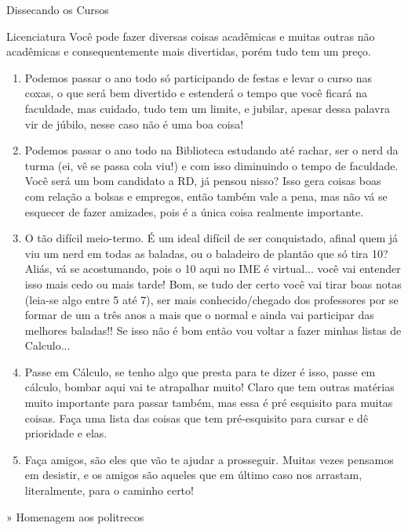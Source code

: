 \begin{secao}{Dissecando os Cursos}
\begin{subsecao}{Licenciatura}
Você pode fazer diversas coisas acadêmicas e muitas outras não acadêmicas e consequentemente mais divertidas, porém tudo tem um preço. 
\begin{enumerate}
\item	Podemos passar o ano todo só participando de festas e levar o curso nas coxas, o que será bem divertido e estenderá o tempo que você ficará na faculdade, mas cuidado, tudo tem um limite, e jubilar, apesar dessa palavra vir de júbilo, nesse caso não é uma boa coisa! 
\item	Podemos passar o ano todo na Biblioteca estudando até rachar, ser o nerd da turma (ei, vê se passa cola viu!) e com isso diminuindo o tempo de faculdade. Você será um bom candidato a RD, já pensou nisso? Isso gera coisas boas com relação a bolsas e empregos, então também vale a pena, mas não vá se esquecer de fazer amizades, pois é a única coisa realmente importante. 
\item	O tão difícil meio-termo. É um ideal difícil de ser conquistado, afinal quem já viu um nerd em todas as baladas, ou o baladeiro de plantão que só tira 10? Aliás, vá se acostumando, pois o 10 aqui no IME é virtual... você vai entender isso mais cedo ou mais tarde! Bom, se tudo der certo você vai tirar boas notas (leia-se algo entre 5 até 7), ser mais conhecido/chegado dos professores por se formar de um a três anos a mais que o normal e ainda vai participar das melhores baladas!! Se isso não é bom então vou voltar a fazer minhas listas de Calculo...
\item	Passe em Cálculo, se tenho algo que presta para te dizer é isso, passe em cálculo, bombar aqui vai te atrapalhar muito! Claro que tem outras matérias muito importante para passar também, mas essa é pré esquisito para muitas coisas. Faça uma lista das coisas que tem pré-esquisito para cursar e dê prioridade e elas.
\item	Faça amigos, são eles que vão te ajudar a prosseguir. Muitas vezes pensamos em desistir, e os amigos são aqueles que em último caso nos arrastam, literalmente, para o caminho certo!

\end{enumerate}

\end{subsecao}


» Homenagem aos politrecos





\end{secao}
